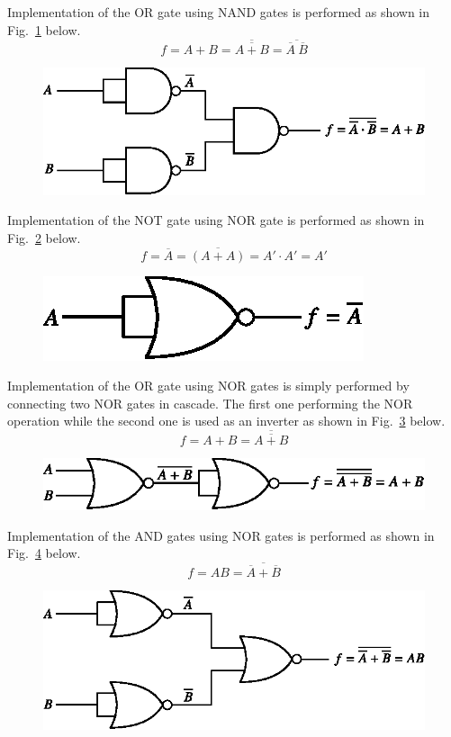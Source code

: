 Implementation of the OR gate using NAND gates is performed as shown in Fig.~\ref{fig5.18} below.
$$
f=A+B=\overline{\overline{A+B}}=\overline{\overline{A} \ \overline{B}}
$$
\begin{figure}[H]
\centering
\includegraphics{chap5/fig3.eps}
\caption{}\label{fig5.18}
\end{figure}

\eject


Implementation of the NOT gate using NOR gate is performed as shown in Fig.~\ref{fig5.19} below.
$$
f=\overline{A}=\overline{(A+A)}=A'\cdot A'=A'
$$
\begin{figure}[H]
\centering
\includegraphics{chap5/fig4.eps}
\caption{}\label{fig5.19}
\end{figure}

Implementation of the OR gate using NOR gates is simply performed by connecting two NOR gates in cascade. The first one performing the NOR operation while the second one is used as an inverter as shown in Fig.~\ref{fig5.20} below.
$$
f=A+B=\overline{\overline{A+B}}
$$
\begin{figure}[H]
\centering
\includegraphics{chap5/fig5.eps}
\caption{}\label{fig5.20}
\end{figure}

Implementation of the AND gates using NOR gates is performed as shown in Fig.~\ref{fig5.21} below.
$$
f=AB=\overline{\overline{A}+\overline{B}}
$$
\begin{figure}[H]
\centering
\includegraphics{chap5/fig6.eps}
\caption{}\label{fig5.21}
\end{figure}

